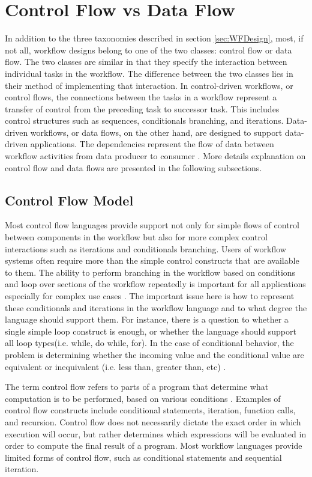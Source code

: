 \section{Control Flow vs Data Flow}\label{sec:CFvsDF}
In addition to the three taxonomies described in section \ref{sec:WFDesign}, most, if not all, workflow designs belong to one of the two classes: control flow or data flow. The two classes are similar in that they specify the interaction between individual tasks in the workflow. The difference between the two classes lies in their method of implementing that interaction. In control-driven workflows, or control flows, the connections between the tasks in a workflow represent a transfer of control from the preceding task to successor task. This includes control structures such as sequences, conditionals branching, and iterations. Data-driven workflows, or data flows, on the other hand, are designed to support data-driven applications. The dependencies represent the flow of data between workflow activities from data producer to consumer \cite{deelman2009workflows}. More details explanation on control flow and data flows are presented in the following subsections. 

\subsection{Control Flow Model}\label{sec:CFModel}
Most control flow languages provide support not only for simple flows of control between components in the workflow but also for more complex control interactions such as iterations and conditionals branching. Users of workflow systems often require more than the simple control constructs that are available to them. The ability to perform branching in the workflow based on conditions and loop over sections of the workflow repeatedly is important for all applications especially for complex use cases \cite{deelman2009workflows}. The important issue here is how to represent these conditionals and iterations in the workflow language and to what degree the language should support them. For instance, there is a question to whether a single simple loop construct is  enough, or whether the language should support all loop types(i.e. while, do while, for). In the case of conditional behavior, the problem is determining whether the incoming value and the conditional value are equivalent or inequivalent (i.e. less than, greater than, etc) \cite{deelman2009workflows}.

The term control flow refers to parts of a program that determine what computation is to be performed, based on various conditions \cite{kelly2011applying}. Examples of control flow constructs include conditional statements, iteration, function calls, and recursion. Control flow does not necessarily dictate the exact order in which execution will occur, but rather determines which expressions will be evaluated in order to compute the final result of a program. Most workflow languages provide limited forms of control flow, such as conditional statements and sequential iteration.

